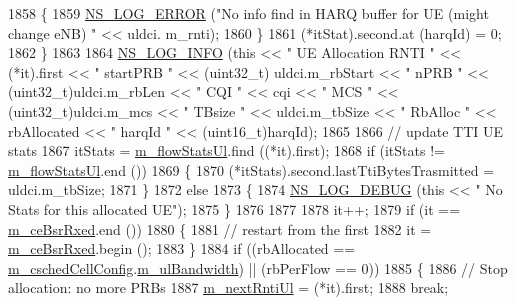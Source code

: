 \begin{DoxyCode}
1858             \{
1859               \hyperlink{group__logging_ga0261a8db1d4ac5f79417d117634fd455}{NS\_LOG\_ERROR} (\textcolor{stringliteral}{"No info find in HARQ buffer for UE (might change eNB) "} << uldci.
      m\_rnti);
1860             \}
1861           (*itStat).second.at (harqId) = 0;
1862         \}
1863 
1864       \hyperlink{group__logging_gafbd73ee2cf9f26b319f49086d8e860fb}{NS\_LOG\_INFO} (\textcolor{keyword}{this} << \textcolor{stringliteral}{" UE Allocation RNTI "} << (*it).first << \textcolor{stringliteral}{" startPRB "} << (uint32\_t)
      uldci.m\_rbStart << \textcolor{stringliteral}{" nPRB "} << (uint32\_t)uldci.m\_rbLen << \textcolor{stringliteral}{" CQI "} << cqi << \textcolor{stringliteral}{" MCS "} << (uint32\_t)uldci.m\_mcs 
      << \textcolor{stringliteral}{" TBsize "} << uldci.m\_tbSize << \textcolor{stringliteral}{" RbAlloc "} << rbAllocated << \textcolor{stringliteral}{" harqId "} << (uint16\_t)harqId);
1865 
1866       \textcolor{comment}{// update TTI  UE stats}
1867       itStats = \hyperlink{classns3_1_1PfFfMacScheduler_a1c3919a5dcda7ca29e667e2bca774ca5}{m\_flowStatsUl}.find ((*it).first);
1868       \textcolor{keywordflow}{if} (itStats != \hyperlink{classns3_1_1PfFfMacScheduler_a1c3919a5dcda7ca29e667e2bca774ca5}{m\_flowStatsUl}.end ())
1869         \{
1870           (*itStats).second.lastTtiBytesTrasmitted =  uldci.m\_tbSize;
1871         \}
1872       \textcolor{keywordflow}{else}
1873         \{
1874           \hyperlink{group__logging_ga413f1886406d49f59a6a0a89b77b4d0a}{NS\_LOG\_DEBUG} (\textcolor{keyword}{this} << \textcolor{stringliteral}{" No Stats for this allocated UE"});
1875         \}
1876 
1877 
1878       it++;
1879       \textcolor{keywordflow}{if} (it == \hyperlink{classns3_1_1PfFfMacScheduler_a9d4cd2380a8e04f1e7d69ac67628b9cc}{m\_ceBsrRxed}.end ())
1880         \{
1881           \textcolor{comment}{// restart from the first}
1882           it = \hyperlink{classns3_1_1PfFfMacScheduler_a9d4cd2380a8e04f1e7d69ac67628b9cc}{m\_ceBsrRxed}.begin ();
1883         \}
1884       \textcolor{keywordflow}{if} ((rbAllocated == \hyperlink{classns3_1_1PfFfMacScheduler_a0be1f7a1e78824b031e48208b8af1048}{m\_cschedCellConfig}.\hyperlink{structns3_1_1FfMacCschedSapProvider_1_1CschedCellConfigReqParameters_a5ab5b102878e6e7e7727a14af4a64d2f}{m\_ulBandwidth}) || (rbPerFlow ==
       0))
1885         \{
1886           \textcolor{comment}{// Stop allocation: no more PRBs}
1887           \hyperlink{classns3_1_1PfFfMacScheduler_ad4bed67ae396b364734c2cc0acc7e2ec}{m\_nextRntiUl} = (*it).first;
1888           \textcolor{keywordflow}{break};

\end{DoxyCode}
